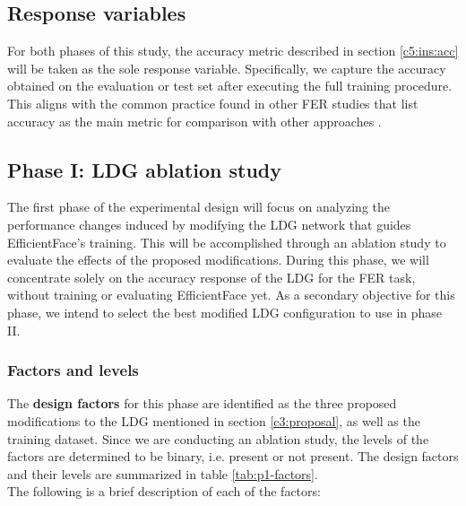 \documentclass[../main.tex]{subfiles}
\begin{document}
\subsection{Response variables}

For both phases of this study, the accuracy metric described in section \ref{c5:ins:acc} will be taken as the sole response variable.
Specifically, we capture the accuracy obtained on the evaluation or test set after executing the full training procedure.
This aligns with the common practice found in other FER studies that list accuracy as the main metric for comparison with other approaches \cite{li2022survey, karnati2023survey, canal2022survey}.

\subsection{Phase I: LDG ablation study}

The first phase of the experimental design will focus on analyzing the performance changes induced by modifying the LDG network that guides EfficientFace's training. 
This will be accomplished through an ablation study to evaluate the effects of the proposed modifications. 
During this phase, we will concentrate solely on the accuracy response of the LDG for the FER task, without training or evaluating EfficientFace yet. 
As a secondary objective for this phase, we intend to select the best modified LDG configuration to use in phase II.

\subsubsection{Factors and levels}

The \textbf{design factors} for this phase are identified as the three proposed modifications to the LDG mentioned in section \ref{c3:proposal}, as well as the training dataset.
Since we are conducting an ablation study, the levels of the factors are determined to be binary, i.e. present or not present.
The design factors and their levels are summarized in table \ref{tab:p1-factors}.\\



The following is a brief description of each of the factors:
\end{document}
